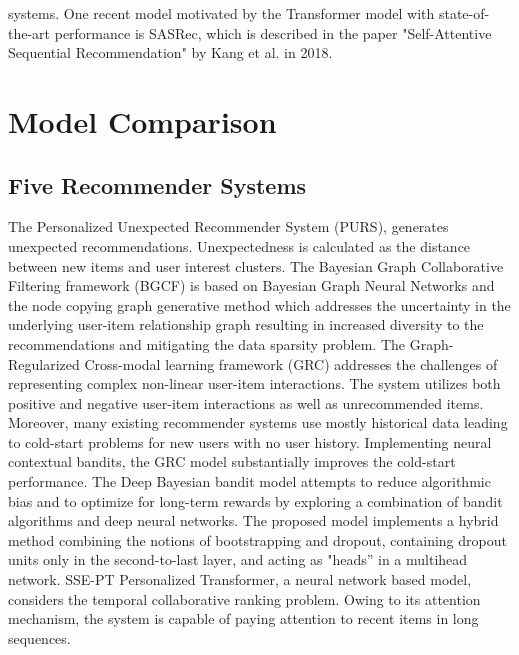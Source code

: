 systems. One recent model motivated by the  Transformer model with state-of-the-art performance is SASRec, which is described in the paper "Self-Attentive Sequential Recommendation" by Kang et al. in 2018. 
\chapter{Model Comparison}
\section{Five Recommender Systems}
The Personalized Unexpected Recommender System (PURS), generates unexpected recommendations.  Unexpectedness is calculated as the distance between new items and user interest clusters. The Bayesian Graph Collaborative Filtering framework (BGCF) is based on Bayesian Graph Neural Networks and the node copying graph generative method which addresses the uncertainty in the underlying user-item relationship graph resulting in increased diversity to the recommendations and mitigating the data sparsity problem. The Graph-Regularized Cross-modal learning framework (GRC) addresses the challenges of representing complex non-linear user-item interactions. The system utilizes both positive and negative user-item interactions as well as unrecommended items. Moreover, many existing recommender systems use mostly historical data leading to cold-start problems for new users with no user history. Implementing neural contextual bandits, the GRC model substantially improves the cold-start performance. The Deep Bayesian bandit model attempts to reduce algorithmic bias and to optimize for long-term rewards by exploring a combination of bandit algorithms and deep neural networks. The proposed model implements a hybrid method combining the notions of bootstrapping and dropout, containing dropout units only in the second-to-last layer, and acting as "heads” in a multihead network.
SSE-PT Personalized Transformer, a neural network based model,  considers the temporal collaborative ranking problem. Owing to its attention mechanism, the system is capable of paying attention to recent items in long sequences.
